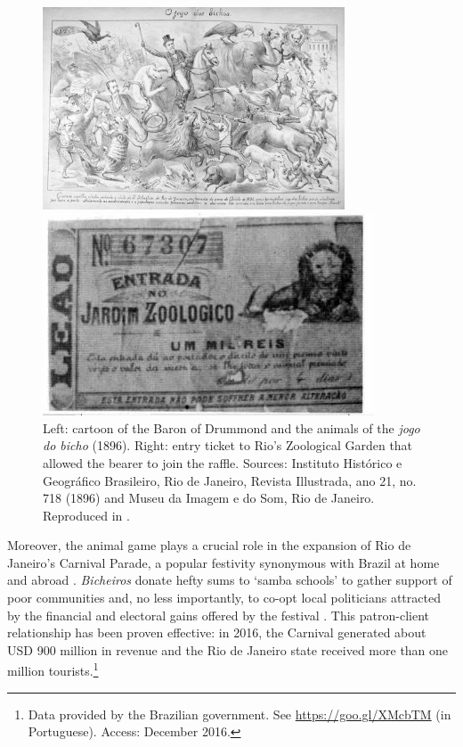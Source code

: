 \begin{figure}[!htbp]
	\centering
	\begin{minipage}[b]{0.45\textwidth}
		\includegraphics[width=\textwidth, height=6cm]{images/bicho01.jpg}
	\end{minipage}
	\hfill
	\begin{minipage}[b]{0.45\textwidth}
		\includegraphics[width=\textwidth, height=6cm]{images/bicho02.jpg}
	\end{minipage}
	\caption{Left: cartoon of the Baron of Drummond and the animals of the \emph{jogo do bicho} (1896). Right: entry ticket to Rio's Zoological Garden that allowed the bearer to join the raffle. Sources: Instituto Histórico e Geográfico Brasileiro, Rio de Janeiro, Revista Illustrada, ano 21, no. 718 (1896) and Museu da Imagem e do Som, Rio de Janeiro. Reproduced in \citet[35--36]{chazkel2011laws}.}
	\label{fig:barao}
\end{figure}

Moreover, the animal game plays a crucial role in the expansion of Rio de Janeiro's Carnival Parade, a popular festivity synonymous with Brazil at home and abroad \citep{araujo2003carnaval,costa2001100,da1973carnaval, da1979carnavais,vianna1995misterio}. \emph{Bicheiros} donate hefty sums to `samba schools' to gather support of poor communities and, no less importantly, to co-opt local politicians attracted by the financial and electoral gains offered by the festival \citep{cavalcanti2006carnaval, queiroz1992carnaval}. This patron-client relationship has been proven effective: in 2016, the Carnival generated about USD 900 million in revenue and the Rio de Janeiro state received more than one million tourists.\footnote{Data provided by the Brazilian government. See \url{https://goo.gl/XMcbTM} (in Portuguese). Access: December 2016.}

